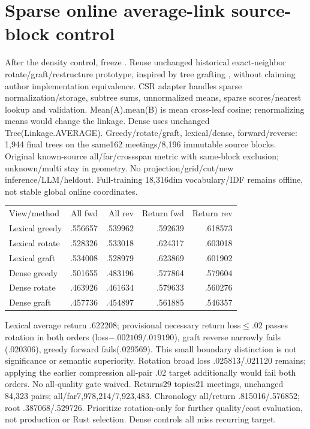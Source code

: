 \documentclass[11pt]{article}
\begin{document}
\section{Sparse online average-link source-block control}
After the density control, freeze
. Reuse unchanged historical
exact-neighbor rotate/graft/restructure prototype, inspired by tree grafting
\cite{grinch}, without claiming author implementation equivalence. CSR adapter
handles sparse normalization/storage, subtree sums, unnormalized means, sparse
scores/nearest lookup and validation. Mean(A).mean(B) is mean cross-leaf cosine;
renormalizing means would change the linkage. Dense uses unchanged
Tree(Linkage.AVERAGE). Greedy/rotate/graft, lexical/dense, forward/reverse:
1,944 final trees on the same162 meetings/8,196 immutable source blocks. Original
known-source all/far/crossspan metric with same-block exclusion; unknown/multi
stay in geometry. No projection/grid/cut/new inference/LLM/heldout. Full-training
18,316dim vocabulary/IDF remains offline, not stable global online coordinates.

\begin{center}\begin{tabular}{lrrrr}
View/method & All fwd & All rev & Return fwd & Return rev \\
Lexical greedy & .556657 & .539962 & .592639 & .618573 \\
Lexical rotate & .528326 & .533018 & .624317 & .603018 \\
Lexical graft & .534008 & .528979 & .623869 & .601902 \\
Dense greedy & .501655 & .483196 & .577864 & .579604 \\
Dense rotate & .463926 & .461634 & .579633 & .560276 \\
Dense graft & .457736 & .454897 & .561885 & .546357
\end{tabular}\end{center}

Lexical average return .622208; provisional necessary return loss$\le.02$ passes
rotation in both orders (loss$-.002109/.019190$), graft reverse narrowly fails
(.020306), greedy forward fails(.029569). This small boundary distinction is
not significance or semantic superiority. Rotation broad loss .025813/.021120
remains; applying the earlier compression all-pair .02 target additionally would
fail both orders. No all-quality gate waived. Returns29 topics21 meetings, unchanged
84,323 pairs; all/far7,978,214/7,923,483. Chronology all/return .815016/.576852;
root .387068/.529726. Prioritize rotation-only for further quality/cost evaluation,
not production or Rust selection. Dense controls all miss recurring target.
\end{document}
